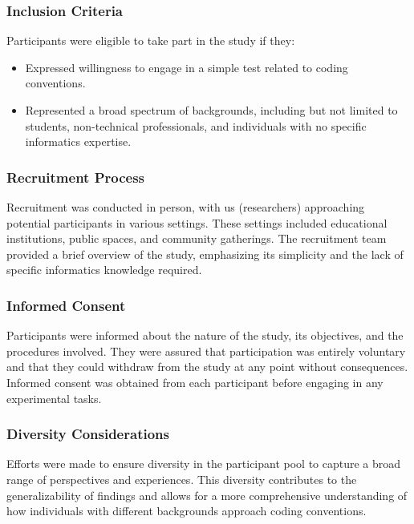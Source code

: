 \documentclass{article}
\begin{document}
\subsubsection*{Inclusion Criteria}

Participants were eligible to take part in the study if they:
\begin{itemize}
  \item Expressed willingness to engage in a simple test related to coding conventions.
  \item Represented a broad spectrum of backgrounds, including but not limited to students, non-technical professionals, and individuals with no specific informatics expertise.
\end{itemize}

\subsubsection*{Recruitment Process}

Recruitment was conducted in person, with us (researchers) approaching potential participants in various settings. These settings included educational institutions, public spaces, and community gatherings. The recruitment team provided a brief overview of the study, emphasizing its simplicity and the lack of specific informatics knowledge required.

\subsubsection*{Informed Consent}

Participants were informed about the nature of the study, its objectives, and the procedures involved. They were assured that participation was entirely voluntary and that they could withdraw from the study at any point without consequences. Informed consent was obtained from each participant before engaging in any experimental tasks.

\subsubsection*{Diversity Considerations}

Efforts were made to ensure diversity in the participant pool to capture a broad range of perspectives and experiences. This diversity contributes to the generalizability of findings and allows for a more comprehensive understanding of how individuals with different backgrounds approach coding conventions.
\end{document}
